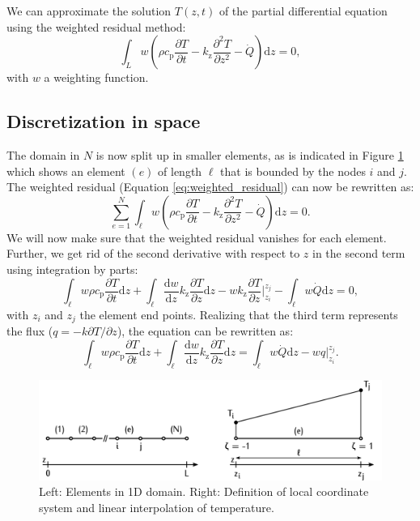 \documentclass[10pt, a4paper, twoside, headinclude,footinclude, BCOR5mm]{scrartcl}
\begin{document}
We can approximate the solution \(T(z,t)\) of the partial differential equation using the weighted residual method:
\begin{equation}
  \label{eq:weighted_residual}
  \int_L w\left(
  \rho c_\text{p} \frac{\partial T}{\partial t} -
  k_\text{z} \frac{\partial^2 T}{\partial z^2} -
  \dot{Q} \right) \text{d}z = 0,
\end{equation}
with \(w\) a weighting function.


\subsection{Discretization in space}
\label{sec:org702fc48}

The domain in \(N\) is now split up in smaller elements, as is indicated in Figure \ref{fig:orgc4dbac9} which shows an element \((e)\) of length \(\ell\) that is bounded by the nodes \(i\) and \(j\). The weighted residual (Equation \ref{eq:weighted_residual}) can now be rewritten as:
\begin{equation}
  \label{eq:weighted_residual_sum}
  \sum_{e=1}^N
  \int_\ell w\left(
    \rho c_\text{p}\frac{\partial T}{\partial t} -
    k_\text{z}\frac{\partial^2 T}{\partial z^2} -
    \dot{Q} \right) \text{d}z = 0.
\end{equation}
We will now make sure that the weighted residual vanishes for each element. Further, we get rid of the second derivative with respect to \(z\) in the second term using integration by parts:
\begin{equation*}
  \int_\ell w \rho c_\text{p}\frac{\partial T}{\partial t} \text{d}z +
  \int_\ell
  \frac{\text{d}w}{\text{d}z}k_\text{z}\frac{\partial T}{\partial z}\text{d}z -
  wk_\text{z}\frac{\partial T}{\partial z}\Biggr|_{z_i}^{z_j} -
  \int_\ell w \dot{Q} \text{d}z = 0,
\end{equation*}
with \(z_i\) and \(z_j\) the element end points. Realizing that the third term represents the flux (\(q = -k \partial T / \partial z\)), the equation can be rewritten as:
\begin{equation}
  \label{eq:weighted_residual_el}
  \int_\ell w \rho c_\text{p}\frac{\partial T}{\partial t} \text{d}z +
  \int_\ell
  \frac{\text{d}w}{\text{d}z}k_\text{z}\frac{\partial T}{\partial z}\text{d}z
  = \int_\ell w \dot{Q} \text{d}z -
  w q \Biggr|_{z_i}^{z_j}.
\end{equation}

\begin{figure}[htbp]
\centering
\includegraphics[width=.9\linewidth]{./fig/elements_sf.png}
\caption{\label{fig:orgc4dbac9}Left: Elements in 1D domain. Right: Definition of local coordinate system and linear interpolation of temperature.}
\end{figure}
\end{document}
